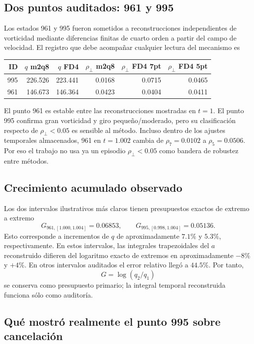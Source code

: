 \documentclass[11pt]{article}
\newcommand{\rhoT}{\rho_{\perp}}
\begin{document}
\subsection{Dos puntos auditados: 961 y 995}

Los estados 961 y 995 fueron sometidos a reconstrucciones independientes de vorticidad mediante diferencias finitas de cuarto orden a partir del campo de velocidad. El registro que debe acompañar cualquier lectura del mecanismo es

\begin{center}
\begin{tabular}{rrrrrr}
\toprule
ID & $q$ m2q8 & $q$ FD4 & $\rhoT$ m2q8 & $\rhoT$ FD4 7pt & $\rhoT$ FD4 5pt \\
\midrule
995 & 226.526 & 223.441 & 0.0168 & 0.0715 & 0.0465 \\
961 & 146.673 & 146.364 & 0.0423 & 0.0404 & 0.0411 \\
\bottomrule
\end{tabular}
\end{center}

El punto 961 es estable entre las reconstrucciones mostradas en $t=1$. El punto 995 confirma gran vorticidad y giro pequeño/moderado, pero su clasificación respecto de $\rhoT<0.05$ es sensible al método. Incluso dentro de los ajustes temporales almacenados, 961 en $t=1.002$ cambia de $\rho_7=0.0102$ a $\rho_5=0.0506$. Por eso el trabajo no usa ya un episodio $\rhoT<0.05$ como bandera de robustez entre métodos.

\subsection{Crecimiento acumulado observado}

Los dos intervalos ilustrativos más claros tienen presupuestos exactos de extremo a extremo
\[
\boxed{G_{961,[1.000,1.004]}=0.06853},
\qquad
\boxed{G_{995,[0.998,1.004]}=0.05136}.
\]
Esto corresponde a incrementos de $q$ de aproximadamente $7.1\%$ y $5.3\%$, respectivamente. En estos intervalos, las integrales trapezoidales del $a$ reconstruido difieren del logaritmo exacto de extremos en aproximadamente $-8\%$ y $+4\%$. En otros intervalos auditados el error relativo llegó a $44.5\%$. Por tanto,
\[
G=\log(q_2/q_1)
\]
se conserva como presupuesto primario; la integral temporal reconstruida funciona sólo como auditoría.

\subsection{Qué mostró realmente el punto 995 sobre cancelación}
\end{document}
